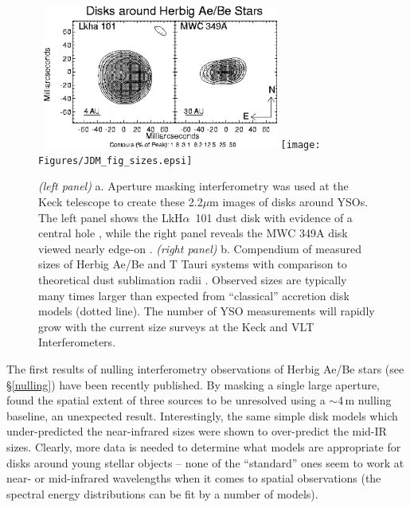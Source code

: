 \documentclass[12pt]{iopart}
\begin{document}
\begin{figure}[tbhp]
\begin{center}
\mbox{
\includegraphics[clip,angle=0.,width=3.05in]{Figures/JDM_twostars.eps}}
\texttt{[image: Figures/JDM\_fig\_sizes.epsi]}
\caption{\footnotesize {\em (left panel)}
  a.  Aperture masking interferometry was used at the Keck telescope
  to create these 2.2$\mu$m images of disks around YSOs.  The left
  panel shows the LkH$\alpha$~101 dust disk with evidence of a central
  hole \citep{tuthill2001a}, while the right panel reveals the MWC
  349A disk viewed nearly edge-on \citep{danchi2001}.  {\em (right
    panel)} b. Compendium of measured sizes of Herbig Ae/Be and T
  Tauri systems with comparison to theoretical dust sublimation radii
  \citep[from Figure~1 of][reproduced with permission of the
  AAS]{monnier2002a}.  Observed sizes are typically many times larger
  than expected from ``classical'' accretion disk models (dotted
  line).  The number of YSO measurements will rapidly grow with the
  current size surveys at the Keck and VLT Interferometers.
\label{herbigfig}}
\end{center}
\end{figure}

The first results of nulling interferometry observations of Herbig
Ae/Be stars (see \S\ref{nulling}) have been recently published.  By
masking a single large aperture, \citet{hinz2001} found the spatial
extent of three sources to be unresolved using a $\sim$4\,m nulling
baseline, an unexpected result.  Interestingly, the same simple disk
models which under-predicted the near-infrared sizes were shown to
over-predict the mid-IR sizes.  Clearly, more data is needed to
determine what models are appropriate for disks around young stellar
objects -- none of the ``standard'' ones seem to work at near- or
mid-infrared wavelengths when it comes to spatial observations (the
spectral energy distributions can be fit by a number of models).
\end{document}
